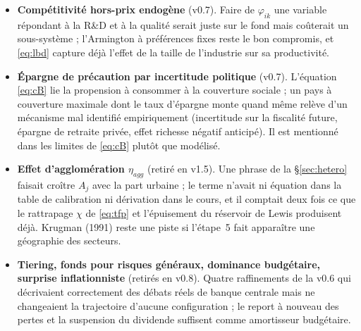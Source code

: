 \documentclass[11pt,a4paper]{article}
\begin{document}
\begin{itemize}
\item \textbf{Compétitivité hors-prix endogène} (v0.7). Faire de $\varphi_{ik}$ une variable répondant à la R\&D et à la qualité serait juste sur le fond mais coûterait un sous-système ; l'Armington à préférences fixes reste le bon compromis, et \eqref{eq:lbd} capture déjà l'effet de la taille de l'industrie sur sa productivité.
\item \textbf{Épargne de précaution par incertitude politique} (v0.7). L'équation \eqref{eq:cB} lie la propension à consommer à la couverture sociale ; un pays à couverture maximale dont le taux d'épargne monte quand même relève d'un mécanisme mal identifié empiriquement (incertitude sur la fiscalité future, épargne de retraite privée, effet richesse négatif anticipé). Il est mentionné dans les limites de \eqref{eq:cB} plutôt que modélisé.
\item \textbf{Effet d'agglomération $\eta_{agg}$} (retiré en v1.5). Une phrase de la \S\ref{sec:hetero} faisait croître $A_j$ avec la part urbaine ; le terme n'avait ni équation dans la table de calibration ni dérivation dans le cours, et il comptait deux fois ce que le rattrapage $\chi$ de \eqref{eq:tfp} et l'épuisement du réservoir de Lewis produisent déjà. Krugman (1991) reste une piste si l'étape~5 fait apparaître une géographie des secteurs.
\item \textbf{Tiering, fonds pour risques généraux, dominance budgétaire, surprise inflationniste} (retirés en v0.8). Quatre raffinements de la v0.6 qui décrivaient correctement des débats réels de banque centrale mais ne changeaient la trajectoire d'aucune configuration ; le report à nouveau des pertes et la suspension du dividende suffisent comme amortisseur budgétaire.
\end{itemize}

\end{document}
